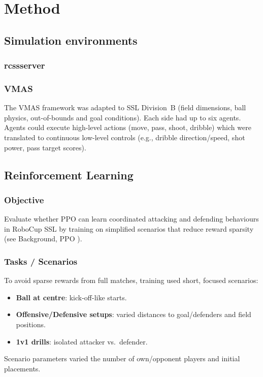 \section{Method}

\subsection{Simulation environments}

\subsubsection{rcssserver}

\subsubsection{VMAS}
The VMAS framework was adapted to SSL Division~B (field dimensions, ball physics, out-of-bounds and goal conditions). Each side had up to six agents. Agents could execute high-level actions (move, pass, shoot, dribble) which were translated to continuous low-level controls (e.g., dribble direction/speed, shot power, pass target scores).

\subsection{Reinforcement Learning}
\label{subsec:rl-method}

\subsubsection{Objective}
Evaluate whether PPO can learn coordinated attacking and defending behaviours in RoboCup SSL by training on simplified scenarios that reduce reward sparsity (see Background, PPO \cite{Schulman2017PPO,Yu2021MAPPO}).

\subsubsection{Tasks / Scenarios}
To avoid sparse rewards from full matches, training used short, focused scenarios:
\begin{itemize}
  \item \textbf{Ball at centre}: kick-off-like starts.
  \item \textbf{Offensive/Defensive setups}: varied distances to goal/defenders and field positions.
  \item \textbf{1v1 drills}: isolated attacker vs.\ defender.
\end{itemize}
Scenario parameters varied the number of own/opponent players and initial placements.

